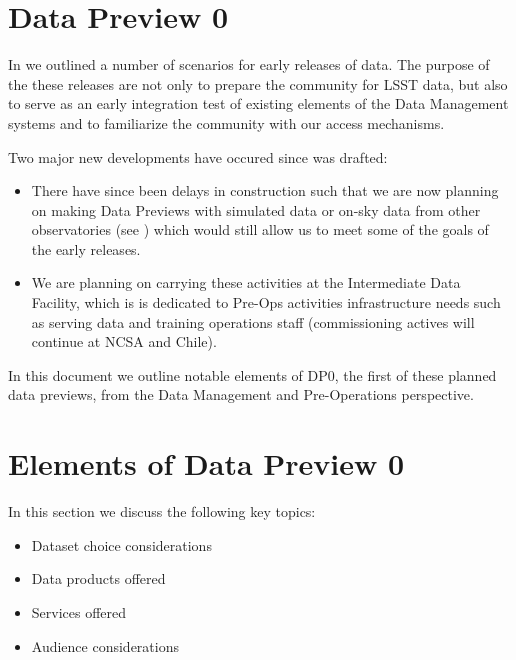 \section{Data Preview 0}\label{sec:dp0}

In  we outlined a number of scenarios for early releases of \RO data. The purpose of the these releases are not only to prepare the community for LSST data, but also to serve as an early integration test of existing elements of the Data Management systems and to familiarize the community with our access mechanisms.  

Two major new developments have occured since  was drafted:

\begin{itemize}
  
\item There have since been delays in construction such that we are now planning on making Data Previews with \RO simulated data or on-sky data from other observatories (see ) which would still allow us to meet some of the goals of the early releases. 

\item We are planning on carrying these activities at the Intermediate Data Facility, which is is dedicated to Pre-Ops activities infrastructure needs such as serving data and training operations staff (commissioning actives will continue at NCSA and Chile).

\end{itemize}

In this document we outline notable elements of DP0, the first of these planned data previews, from the Data Management and Pre-Operations perspective.

\section{Elements of Data Preview 0}

In this section we discuss the following key topics:

\begin{itemize}

\item Dataset choice considerations

\item Data products offered

\item Services offered

\item Audience considerations

\end{itemize}

